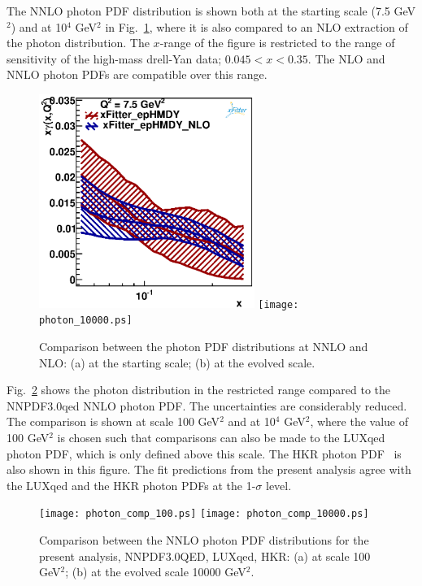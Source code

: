 The NNLO photon PDF distribution is shown 
both at the starting scale (7.5 GeV$^{2}$) and at 10$^{4}$ GeV$^{2}$ 
 in Fig.~\ref{photon}, where it is also compared to an NLO extraction of the photon distribution.
The $x$-range of the figure is restricted to the range of sensitivity of the high-mass drell-Yan data;
$0.045 < x < 0.35$. The NLO and NNLO photon PDFs are compatible over this range.
\begin{figure}
\includegraphics[width=7cm]{photon_7.5.ps} 
\texttt{[image: photon\_10000.ps]} 
\caption{Comparison between the photon PDF distributions at NNLO and NLO: (a) at the starting scale; (b) at the evolved scale.}
\label{photon}
\end{figure}

Fig.~\ref{photon_zoom} 
shows the photon distribution in the restricted range compared to the NNPDF3.0qed NNLO photon PDF.
The uncertainties are considerably reduced. The comparison is shown at scale 100 GeV$^{2}$ and 
at 10$^{4}$ GeV$^{2}$, where the value of 100 GeV$^{2}$ is chosen such that comparisons can also be 
made to the LUXqed~\cite{luxqed} photon PDF, which is only defined above this scale.  The 
HKR photon PDF~\cite{hkr} is also shown in this figure. The fit predictions from the present analysis
agree  with the LUXqed and the HKR photon PDFs at the 1-$\sigma$ level. 


\begin{figure}
\texttt{[image: photon\_comp\_100.ps]} 
\texttt{[image: photon\_comp\_10000.ps]} 
\caption{Comparison between the NNLO photon PDF distributions for the present analysis, NNPDF3.0QED, LUXqed, HKR: (a) at scale 100 GeV$^{2}$; (b) at the evolved scale 10000 GeV$^{2}$.}
\label{photon_zoom}
\end{figure}

